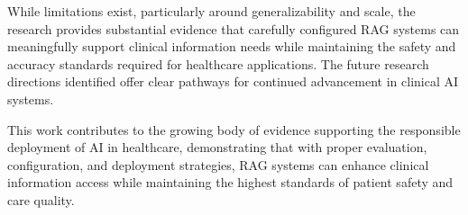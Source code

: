 While limitations exist, particularly around generalizability and scale, the research provides substantial evidence that carefully configured RAG systems can meaningfully support clinical information needs while maintaining the safety and accuracy standards required for healthcare applications. The future research directions identified offer clear pathways for continued advancement in clinical AI systems.

This work contributes to the growing body of evidence supporting the responsible deployment of AI in healthcare, demonstrating that with proper evaluation, configuration, and deployment strategies, RAG systems can enhance clinical information access while maintaining the highest standards of patient safety and care quality.
